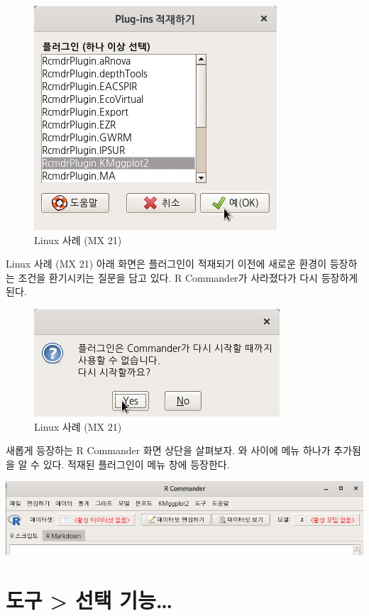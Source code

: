 \documentclass[
]{book}
\begin{document}
\begin{figure}
\centering
\includegraphics{fig/tools-load-plugin-03.png}
\caption{Linux 사례 (MX 21)}
\end{figure}

Linux 사례 (MX 21)
아래 화면은 플러그인이 적재되기 이전에 새로운 환경이 등장하는 조건을 환기시키는 질문을 담고 있다. R Commander가 사라졌다가 다시 등장하게된다.

\begin{figure}
\centering
\includegraphics{fig/tools-load-plugin-04.png}
\caption{Linux 사례 (MX 21)}
\end{figure}

새롭게 등장하는 R Commander 화면 상단을 살펴보자. 와 사이에 메뉴 하나가 추가됨을 알 수 있다. 적재된 플러그인이 메뉴 창에 등장한다.

\includegraphics{fig/tools-load-plugin-05.png}

\hypertarget{uxb3c4uxad6c-uxc120uxd0dd-uxae30uxb2a5}{%
\section{도구 \textgreater{} 선택 기능\ldots{}}\label{uxb3c4uxad6c-uxc120uxd0dd-uxae30uxb2a5}}
\end{document}
